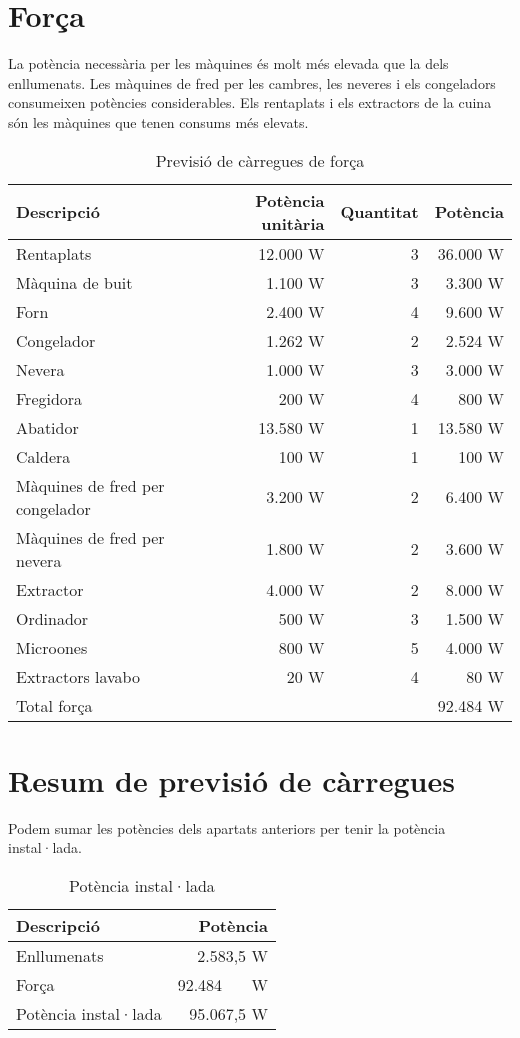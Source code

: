 \section{Força}
La potència necessària per les màquines és molt més elevada que la dels enllumenats. Les màquines de fred per les cambres, les neveres i els congeladors consumeixen potències considerables. Els rentaplats i els extractors de la cuina són les màquines que tenen consums més elevats.\\
%
\begin{table}[H]
\small
\begin{center}
 \begin{tabularx}{\textwidth}{|X|r|r|r|}%
 \hline
 Descripció & Potència unitària & Quantitat & Potència \\
 \hline
 Rentaplats & 12.000 W & 3 &  36.000 W \\
 Màquina de buit & 1.100 W & 3 &  3.300 W \\
 Forn & 2.400 W & 4 &  9.600 W\\ 
 Congelador & 1.262 W & 2 &  2.524 W \\
 Nevera & 1.000 W & 3 &  3.000 W \\
 Fregidora & 200 W & 4 &  800 W \\
 Abatidor & 13.580 W & 1 &  13.580 W\\ 
 Caldera & 100 W & 1 &  100 W \\
 Màquines de fred per congelador & 3.200 W & 2 & 6.400 W \\
 Màquines de fred per nevera & 1.800 W & 2 &  3.600 W \\
 Extractor & 4.000 W & 2 & 8.000 W \\
 Ordinador & 500 W & 3 &  1.500 W \\
 Microones & 800 W & 5 & 4.000 W \\
 Extractors lavabo & 20 W & 4 & 80 W\\
 \hline
 Total força & & &  92.484 W\\
 \hline
 \end{tabularx}
 \caption{Previsió de càrregues de força}
\end{center}
\end{table}
%
%
%


\section{Resum de previsió de càrregues}
Podem sumar les potències dels apartats anteriors per tenir la potència instal·lada.
\begin{table}[H]
\small
\begin{center}
 \begin{tabular}{|l|r|}%
 \hline
 Descripció  & Potència \\
 \hline
  Enllumenats & 2.583,5 W \\
  Força &  92.484 \ \ \ W \\ 
 \hline
 Potència instal·lada & 95.067,5 W\\
 \hline
 \end{tabular}
 \caption{Potència instal·lada}
\end{center}
\end{table}

